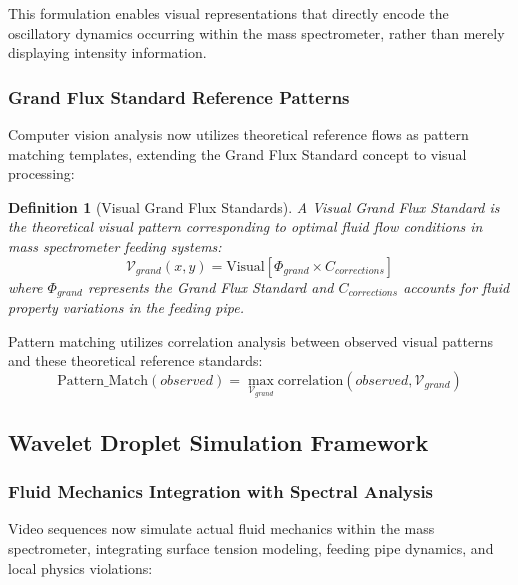\documentclass[11pt,a4paper]{article}
\newtheorem{definition}[theorem]{Definition}
\theoremstyle{remark}
\begin{document}
This formulation enables visual representations that directly encode the oscillatory dynamics occurring within the mass spectrometer, rather than merely displaying intensity information.

\subsubsection{Grand Flux Standard Reference Patterns}

Computer vision analysis now utilizes theoretical reference flows as pattern matching templates, extending the Grand Flux Standard concept to visual processing:

\begin{definition}[Visual Grand Flux Standards]
A Visual Grand Flux Standard is the theoretical visual pattern corresponding to optimal fluid flow conditions in mass spectrometer feeding systems:
\begin{equation}
\mathcal{V}_{grand}(x,y) = \text{Visual}[\Phi_{grand} \times C_{corrections}]
\end{equation}
where $\Phi_{grand}$ represents the Grand Flux Standard and $C_{corrections}$ accounts for fluid property variations in the feeding pipe.
\end{definition}

Pattern matching utilizes correlation analysis between observed visual patterns and these theoretical reference standards:
\begin{equation}
\text{Pattern\_Match}(observed) = \max_{\mathcal{V}_{grand}} \text{correlation}(observed, \mathcal{V}_{grand})
\end{equation}

\subsection{Wavelet Droplet Simulation Framework}

\subsubsection{Fluid Mechanics Integration with Spectral Analysis}

Video sequences now simulate actual fluid mechanics within the mass spectrometer, integrating surface tension modeling, feeding pipe dynamics, and local physics violations:
\end{document}

